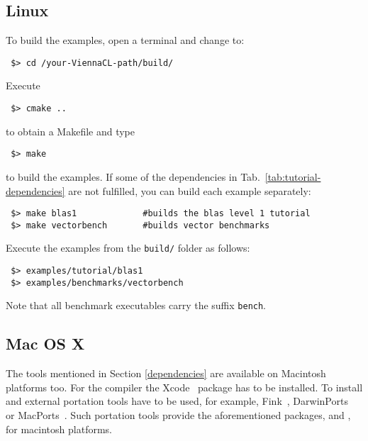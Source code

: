 \subsection{Linux}
To build the examples, open a terminal and change to:
\begin{lstlisting}
 $> cd /your-ViennaCL-path/build/
\end{lstlisting}
Execute
\begin{lstlisting}
 $> cmake ..
\end{lstlisting}
to obtain a Makefile and type
\begin{lstlisting}
 $> make
\end{lstlisting}
to build the examples. If some of the dependencies in Tab.~\ref{tab:tutorial-dependencies} are not fulfilled, you can build each example separately:
\begin{lstlisting}
 $> make blas1             #builds the blas level 1 tutorial
 $> make vectorbench       #builds vector benchmarks
\end{lstlisting}


Execute the examples from the \lstinline|build/| folder as follows:
\begin{lstlisting}
 $> examples/tutorial/blas1
 $> examples/benchmarks/vectorbench
\end{lstlisting}
Note that all benchmark executables carry the suffix \lstinline|bench|.


\subsection{Mac OS X}
\label{apple}
The tools mentioned in Section \ref{dependencies} are available on
Macintosh platforms too.
For the {\GCC} compiler the Xcode~\cite{xcode} package has to be installed.
To install {\CMake} and {\Boost} external portation tools have to be used,
for example, Fink~\cite{fink}, DarwinPorts~\cite{darwinports}
or MacPorts~\cite{macports}. Such portation tools provide the
aforementioned packages, {\CMake} and {\Boost}, for macintosh platforms.


